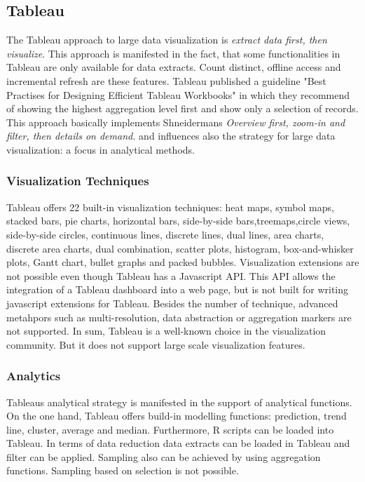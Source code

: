 \subsection*{Tableau}
The Tableau approach to large data visualization is \textit{extract data first, then visualize}. This approach is manifested in the fact, that some functionalities in Tableau are only available for data extracts. Count distinct, offline access and incremental refresh are these features.
Tableau published a guideline "Best Practises for Designing Efficient Tableau Workbooks" in which they recommend of showing the highest aggregation level first and show only a selection of records. This approach basically implements Shneidermans \textit{Overview first, zoom-in and filter, then details on demand.} and influences also the strategy for large data visualization: a focus in analytical methods. 

\subsubsection*{Visualization Techniques}
Tableau offers 22 built-in visualization techniques: heat maps, symbol maps, stacked bars, pie charts, horizontal bars, side-by-side bars,treemaps,circle views, side-by-side circles, continuous lines, discrete lines, dual lines, area charts,  discrete area charts, dual combination, scatter plots, histogram, box-and-whisker plots, Gantt chart, bullet graphs and packed bubbles.
Visualization extensions are not possible even though Tableau has a Javascript API. This API allows the integration of a Tableau dashboard into a web page, but is not built for writing javascript extensions for Tableau. Besides the number of technique, advanced metahpors such as multi-resolution, data abstraction or aggregation markers are not supported. 
In sum, Tableau is a well-known choice in the visualization community. But it does not support large scale visualization features. 

\subsubsection*{Analytics}
Tableaus analytical strategy is manifested in the support of analytical functions. On the one hand, Tableau offers build-in modelling functions: prediction, trend line, cluster, average and median. Furthermore, R scripts can be loaded into Tableau.  
In terms of data reduction data extracts can be loaded in Tableau and filter can be applied. Sampling also can be achieved by using aggregation functions. Sampling based on selection is not possible.

